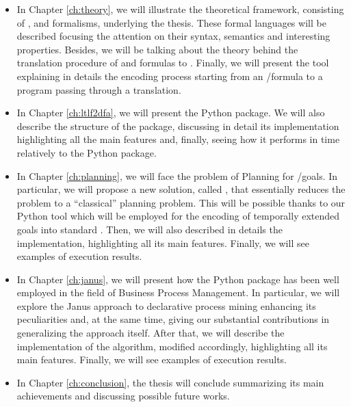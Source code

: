 \begin{itemize}
\item In Chapter \ref{ch:theory}, we will illustrate the theoretical framework, consisting of \LTL, \LTLf and \PLTL formalisms, underlying the thesis. These formal languages will be described focusing the attention on their syntax, semantics and interesting properties. Besides, we will be talking about the theory behind the translation procedure of \LTLf and \PLTL formulas to \DFAs. Finally, we will present the \MONA tool explaining in details the encoding process starting from an \LTLf/\PLTL formula to a \MONA program passing through a \FOL translation.

\item In Chapter \ref{ch:ltlf2dfa}, we will present the \LTLfToDFA Python package. We will also describe the structure of the package, discussing in detail its implementation highlighting all the main features and, finally, seeing how it performs in time relatively to the \FLLOAT Python package.

\item In Chapter \ref{ch:planning}, we will face the problem of \FOND Planning for \LTLf/\PLTL goals. In particular, we will propose a new solution, called \FONDFOR, that essentially reduces the problem to a ``classical'' \FOND planning problem. This will be possible thanks to our \LTLfToDFA Python tool which will be employed for the encoding of temporally extended goals into standard \PDDL. Then, we will also described in details the \FONDFOR implementation, highlighting all its main features. Finally, we will see examples of execution results.

\item In Chapter \ref{ch:janus}, we will present how the \LTLfToDFA Python package has been well employed in the field of Business Process Management. In particular, we will explore the Janus approach to declarative process mining enhancing its peculiarities and, at the same time, giving our substantial contributions in generalizing the approach itself. After that, we will describe the implementation of the \janus algorithm, modified accordingly, highlighting all its main features. Finally, we will see examples of execution results.

\item In Chapter \ref{ch:conclusion}, the thesis will conclude summarizing its main achievements and discussing possible future works.
\end{itemize}























